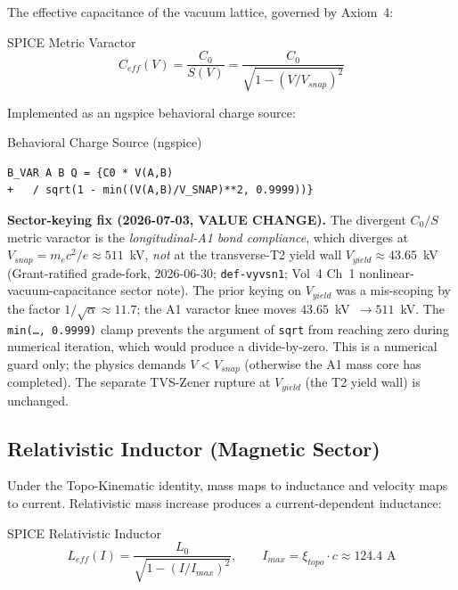 The effective capacitance of the vacuum lattice, governed by Axiom~4:
\begin{resultbox}{SPICE Metric Varactor}
\begin{equation}
    C_{eff}(V) = \frac{C_0}{S(V)} = \frac{C_0}{\sqrt{1 - (V/V_{snap})^2}}
    \label{eq:spice_varactor}
\end{equation}
\end{resultbox}

\noindent Implemented as an ngspice behavioral charge source:
\begin{codebox}{Behavioral Charge Source (ngspice)}
\begin{verbatim}
B_VAR A B Q = {C0 * V(A,B)
+   / sqrt(1 - min((V(A,B)/V_SNAP)**2, 0.9999))}
\end{verbatim}
\end{codebox}

\noindent \textbf{Sector-keying fix (2026-07-03, VALUE CHANGE).} The divergent
$C_0/S$ metric varactor is the \emph{longitudinal-A1 bond compliance}, which
diverges at $V_{snap} = m_e c^2/e \approx 511$~kV, \emph{not} at the transverse-T2
yield wall $V_{yield} \approx 43.65$~kV (Grant-ratified grade-fork, 2026-06-30;
\texttt{def-vyvsn1}; Vol~4 Ch~1 nonlinear-vacuum-capacitance sector note). The
prior keying on $V_{yield}$ was a mis-scoping by the factor $1/\sqrt{\alpha}
\approx 11.7$; the A1 varactor knee moves $43.65$~kV~$\to 511$~kV. The
\texttt{min(\ldots, 0.9999)} clamp prevents the argument of \texttt{sqrt} from
reaching zero during numerical iteration, which would produce a divide-by-zero.
This is a numerical guard only; the physics demands $V < V_{snap}$ (otherwise the
A1 mass core has completed). The separate TVS-Zener rupture at $V_{yield}$ (the T2
yield wall) is unchanged.


\subsection{Relativistic Inductor (Magnetic Sector)}

Under the Topo-Kinematic identity, mass maps to inductance and velocity
maps to current.  Relativistic mass increase produces a current-dependent
inductance:
\begin{resultbox}{SPICE Relativistic Inductor}
\begin{equation}
    L_{eff}(I) = \frac{L_0}{\sqrt{1 - (I/I_{max})^2}}, \qquad I_{max} = \xi_{topo} \cdot c \approx 124.4 \text{ A}
    \label{eq:spice_inductor}
\end{equation}
\end{resultbox}


